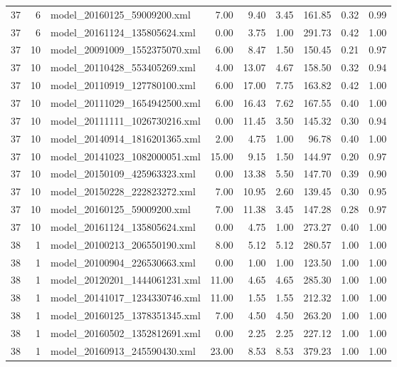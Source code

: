 \begin{table}[ht]
\begin{tabular}{rrlrrrrrr}
   37 &   6 & model\_20160125\_59009200.xml & 7.00 & 9.40 & 3.45 & 161.85 & 0.32 & 0.99 \\ 
   37 &   6 & model\_20161124\_135805624.xml & 0.00 & 3.75 & 1.00 & 291.73 & 0.42 & 1.00 \\ 
   37 &  10 & model\_20091009\_1552375070.xml & 6.00 & 8.47 & 1.50 & 150.45 & 0.21 & 0.97 \\ 
   37 &  10 & model\_20110428\_553405269.xml & 4.00 & 13.07 & 4.67 & 158.50 & 0.32 & 0.94 \\ 
   37 &  10 & model\_20110919\_127780100.xml & 6.00 & 17.00 & 7.75 & 163.82 & 0.42 & 1.00 \\ 
   37 &  10 & model\_20111029\_1654942500.xml & 6.00 & 16.43 & 7.62 & 167.55 & 0.40 & 1.00 \\ 
   37 &  10 & model\_20111111\_1026730216.xml & 0.00 & 11.45 & 3.50 & 145.32 & 0.30 & 0.94 \\ 
   37 &  10 & model\_20140914\_1816201365.xml & 2.00 & 4.75 & 1.00 & 96.78 & 0.40 & 1.00 \\ 
   37 &  10 & model\_20141023\_1082000051.xml & 15.00 & 9.15 & 1.50 & 144.97 & 0.20 & 0.97 \\ 
   37 &  10 & model\_20150109\_425963323.xml & 0.00 & 13.38 & 5.50 & 147.70 & 0.39 & 0.90 \\ 
   37 &  10 & model\_20150228\_222823272.xml & 7.00 & 10.95 & 2.60 & 139.45 & 0.30 & 0.95 \\ 
   37 &  10 & model\_20160125\_59009200.xml & 7.00 & 11.38 & 3.45 & 147.28 & 0.28 & 0.97 \\ 
   37 &  10 & model\_20161124\_135805624.xml & 0.00 & 4.75 & 1.00 & 273.27 & 0.40 & 1.00 \\ 
   38 &   1 & model\_20100213\_206550190.xml & 8.00 & 5.12 & 5.12 & 280.57 & 1.00 & 1.00 \\ 
   38 &   1 & model\_20100904\_226530663.xml & 0.00 & 1.00 & 1.00 & 123.50 & 1.00 & 1.00 \\ 
   38 &   1 & model\_20120201\_1444061231.xml & 11.00 & 4.65 & 4.65 & 285.30 & 1.00 & 1.00 \\ 
   38 &   1 & model\_20141017\_1234330746.xml & 11.00 & 1.55 & 1.55 & 212.32 & 1.00 & 1.00 \\ 
   38 &   1 & model\_20160125\_1378351345.xml & 7.00 & 4.50 & 4.50 & 263.20 & 1.00 & 1.00 \\ 
   38 &   1 & model\_20160502\_1352812691.xml & 0.00 & 2.25 & 2.25 & 227.12 & 1.00 & 1.00 \\ 
   38 &   1 & model\_20160913\_245590430.xml & 23.00 & 8.53 & 8.53 & 379.23 & 1.00 & 1.00 \\ 

\end{tabular}
\end{table}
